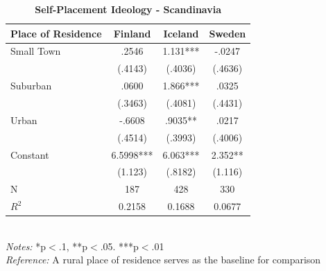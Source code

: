 \documentclass[12pt, titlepage]{article}
\newcommand\e{\emph}
\newcommand\tb{\textbf}
\begin{document}
\begin{singlespace}
	\begin{table}[H]
		\centering
		\caption{\tb{Self-Placement Ideology - Scandinavia}}
		\begin{tabulary}{\linewidth}{l c c c}

			\hline
			\tb{Place of Residence}&\tb{Finland}&\tb{Iceland}&\tb{Sweden} \\
			\hline
			Small Town&.2546&1.131***&-.0247 \\
			&(.4143)&(.4036)&(.4636) \\
			Suburban&.0600&1.866***&.0325 \\
			&(.3463)&(.4081)&(.4431) \\
			Urban&-.6608&.9035**& .0217\\
			&(.4514)&(.3993)&(.4006) \\
			Constant&6.5998***&6.063***&2.352** \\
			&(1.123)&(.8182)&(1.116) \\
			N&187&428&330\\
			$R^2$&0.2158&0.1688&0.0677 \\
			\hline
		\end{tabulary}
		\\
		\e{Notes:} *p$<$.1, **p$<$.05. ***p$<$.01 \\
		\e{Reference:} A rural place of residence serves as the baseline for comparison
		\label{table7}
	\end{table}
\end{singlespace}
\end{document}
